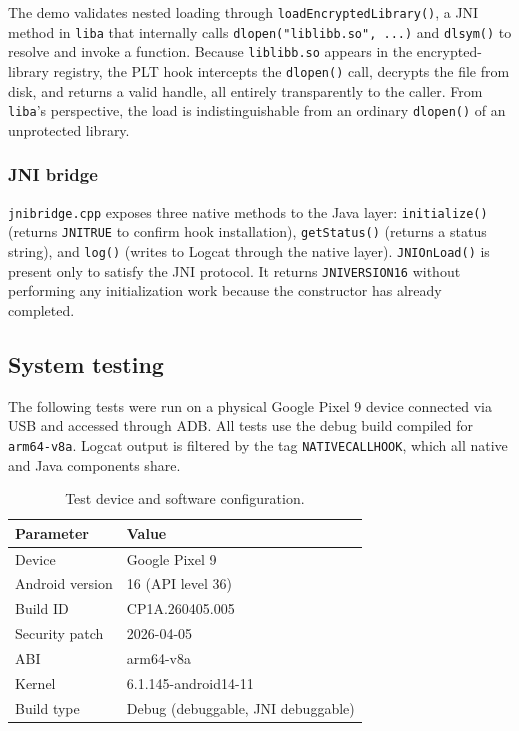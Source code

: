 \documentclass[11pt,a4paper]{report}
\renewcommand\_{{\textunderscore\allowbreak}}
\begin{document}
The demo validates nested loading through \texttt{loadEncryptedLibrary()}, a JNI method in \texttt{liba} that internally calls \texttt{dlopen("liblibb.so", ...)} and \texttt{dlsym()} to resolve and invoke a function.  Because \linebreak \texttt{liblibb.so} appears in the encrypted-library registry, the PLT hook intercepts the \texttt{dlopen()} call, decrypts the file from disk, and returns a valid handle, all entirely transparently to the caller.  From \texttt{liba}'s perspective, the load is indistinguishable from an ordinary \texttt{dlopen()} of an unprotected library.

\subsubsection{JNI bridge}

\texttt{jni\_bridge.cpp} exposes three native methods to the Java layer: \texttt{initialize()} (returns \texttt{JNI\_TRUE} to confirm hook installation), \texttt{getStatus()} (returns a status string), and \texttt{log()} (writes to Logcat through the native layer).  \texttt{JNI\_OnLoad()} is present only to satisfy the JNI protocol. It returns \texttt{JNI\_VERSION\_1\_6} without performing any initialization work because the constructor has already completed.

\subsection{System testing}

The following tests were run on a physical Google Pixel 9 device connected via USB and accessed through ADB. All tests use the debug build compiled for \texttt{arm64-v8a}. Logcat output is filtered by the tag \texttt{NATIVECALLHOOK}, which all native and Java components share.

\begin{table}[h]
\centering
\caption{Test device and software configuration.}
\label{tab:test_env}
\begin{tabular}{l l}
    \hline
    \textbf{Parameter} & \textbf{Value} \\
    \hline
    Device & Google Pixel 9 \\
    Android version & 16 (API level 36) \\
    Build ID & CP1A.260405.005 \\
    Security patch & 2026-04-05 \\
    ABI & arm64-v8a \\
    Kernel & 6.1.145-android14-11 \\
    Build type & Debug (debuggable, JNI debuggable) \\
    \hline
\end{tabular}
\end{table}
\end{document}
